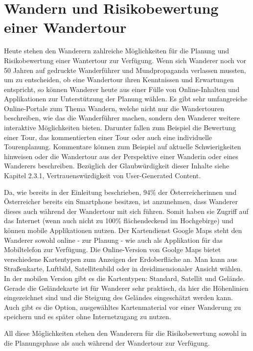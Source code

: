 \section{Wandern und Risikobewertung einer Wandertour}

Heute stehen den Wanderern zahlreiche Möglichkeiten für die Planung und Risikobewertung einer Wantertour zur Verfügung. Wenn sich Wanderer noch vor 50 Jahren auf gedruckte Wanderführer und Mundpropaganda verlassen mussten, um zu entscheiden, ob eine Wandertour ihren Kenntnissen und Erwartungen entspricht, so können Wanderer heute aus einer Fülle von Online-Inhalten und Applikationen zur Unterstützung der Planung wählen. Es gibt sehr umfangreiche Online-Portale zum Thema Wandern, welche nicht nur die Wandertouren beschreiben, wie das die Wanderführer machen, sondern den Wanderer  weitere interaktive Möglichkeiten bieten. Darunter fallen zum Beispiel die Bewertung einer Tour, das kommentierten einer Tour oder auch eine individuelle Tourenplanung. Kommentare können zum Beispiel auf aktuelle Schwierigkeiten hinweisen oder die Wandertour aus der Perspektive einer Wanderin oder eines Wanderers beschreiben. Bezüglich der Glaubwürdigkeit dieser Inhalte siehe Kapitel 2.3.1, Vertrauenswürdigkeit von User-Generated Content.

Da, wie bereits in der Einleitung beschrieben, 94\% der Österreicherinnen und Österreicher bereits ein Smartphone besitzen, ist anzunehmen, dass Wanderer dieses auch während der Wandertour mit sich führen. Somit haben sie Zugriff auf das Internet (wenn auch nicht zu 100\% flächendeckend im Hochgebirge) und können mobile Applikationen nutzen. Der Kartendienst Google Maps steht den Wanderer sowohl online - zur Planung -  wie auch als Applikation für das Mobiltelefon zur Verfügung. Die Online-Version von Goolge Maps bietet verschiedene Kartentypen zum Anzeigen der Erdoberfläche an. Man kann aus Straßenkarte, Luftbild, Satellitenbild oder in dreidimensionaler Ansicht wählen. In der mobilen Version gibt es die Kartentypen: Standard, Satellit und Gelände. Gerade die Geländekarte ist für Wanderer sehr praktisch, da hier die Höhenlinien eingezeichnet sind und die Steigung des Geländes eingeschätzt werden  kann. Auch gibt es die Option, ausgewähltes Kartenmaterial vor einer Wanderung zu speichern und es später ohne Internetzugang zu nutzen.

All diese Möglichkeiten stehen den Wanderern für die Risikobewertung sowohl in die Planungsphase als auch während der Wandertour zur Verfügung.




